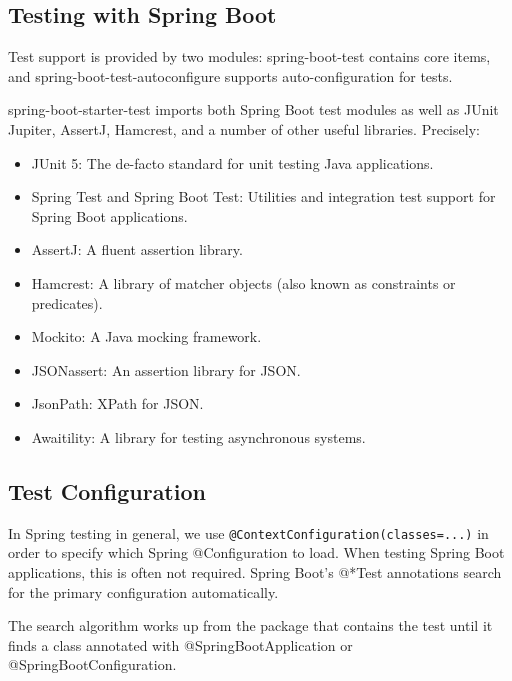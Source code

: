 \documentclass{scrartcl}
\begin{document}
\subsection{Testing with Spring Boot}

Test support is provided by two modules: spring-boot-test contains core items, and spring-boot-test-autoconfigure supports auto-configuration for tests.

spring-boot-starter-test imports both Spring Boot test modules as well as JUnit Jupiter, AssertJ, Hamcrest, and a number of other useful libraries. Precisely:

\begin{itemize}
    \item JUnit 5: The de-facto standard for unit testing Java applications.

    \item Spring Test and Spring Boot Test: Utilities and integration test support for Spring Boot applications.

    \item AssertJ: A fluent assertion library.

    \item Hamcrest: A library of matcher objects (also known as constraints or predicates).

    \item Mockito: A Java mocking framework.

    \item JSONassert: An assertion library for JSON.

    \item JsonPath: XPath for JSON.

    \item Awaitility: A library for testing asynchronous systems.

\end{itemize}

\subsection{Test Configuration}

In Spring testing in general, we use \lstinline|@ContextConfiguration(classes=...)| in order to specify which Spring @Configuration to load.
When testing Spring Boot applications, this is often not required. Spring Boot’s @*Test annotations search for the primary configuration automatically.

The search algorithm works up from the package that contains the test until it finds a class annotated with @SpringBootApplication or @SpringBootConfiguration.
\end{document}

